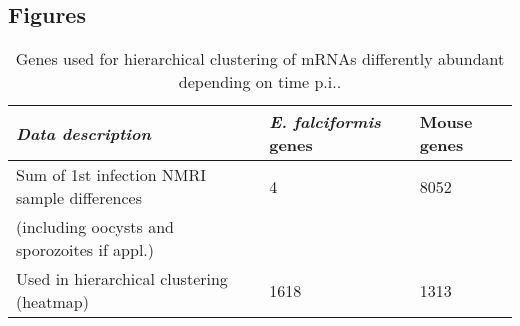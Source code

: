 \documentclass{bmcart}
\begin{document}
\begin{backmatter}


\section*{Figures}






\setlength{\tabcolsep}{10pt}
\begin{table}[H]
\small
\begin{center}
\caption{Genes used for hierarchical clustering of mRNAs differently abundant depending on time p.i..}
\begin{tabular}{*3l}    \toprule
	\textit{Data description} & \emph{E. falciformis} genes & Mouse genes	\\ \midrule
	Sum of 1st infection NMRI sample differences	& 4 & 8052 \\ 
	(including oocysts and sporozoites if appl.)	\\	
	Used in hierarchical clustering (heatmap)  	& 1618 & 1313 \\ 	\bottomrule	
\hline
\end{tabular}
\end{center}
\end{table}




\newcommand{\bcell}[2][c]{%
  \begin{tabular}[#1]{@{}c@{}}#2\end{tabular}}



\end{backmatter}
\end{document}
